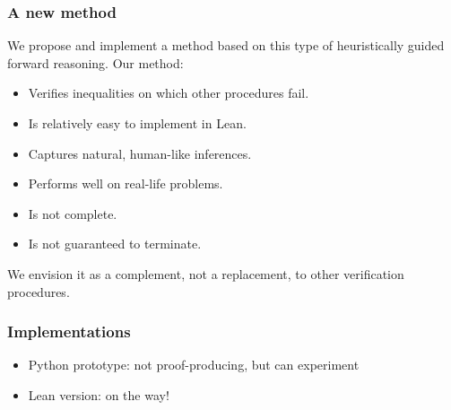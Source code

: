 \documentclass{beamer}
\begin{document}
\begin{frame}
 \frametitle{A new method}
 We propose and implement a method based on this type of heuristically guided forward reasoning. Our method:
 
 \begin{itemize}
  \item Verifies inequalities on which other procedures fail.
  \item Is relatively easy to implement in Lean.
  \item Captures natural, human-like inferences.
  \item Performs well on real-life problems.
  \vspace{.25cm}
  \item Is not complete.
  \item Is not guaranteed to terminate.
 \end{itemize}
 
 We envision it as a complement, not a replacement, to other verification procedures.

\end{frame}

\begin{frame}
\frametitle{Implementations}
\begin{itemize}
\item Python prototype: not proof-producing, but can experiment
\item Lean version: on the way!
\end{itemize}
\end{frame}
\end{document}
